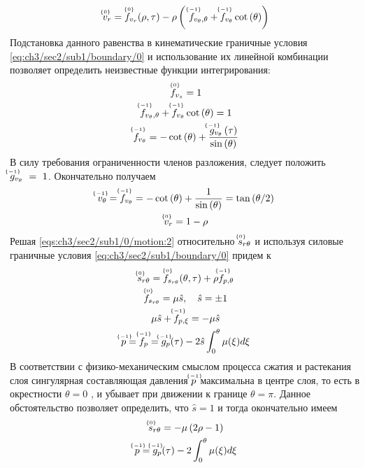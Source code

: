 \begin{equation*}
  \uindex{v}{0}_{r} = \uindex{f}{0}_{v_{r}}(\rho, \tau) -\rho \left(\ \uindex{f}{-1}_{v_{\theta},\theta} + \uindex{f}{-1}_{v_{\theta}} \cot{\left(\theta\right)}\right)
\end{equation*}
Подстановка данного равенства в кинематические граничные условия \cref{eq:ch3/sec2/sub1/boundary/0} и использование их линейной комбинации позволяет определить неизвестные функции интегрирования:
\begin{gather*}
  \uindex{f}{0}_{v_{z}} = 1
  \\
  \uindex{f}{-1}_{v_{\theta},\theta} + \uindex{f}{-1}_{v_{\theta}} \cot{\left(\theta\right)} = 1
  \\
  \uindex{f}{-1}_{v_{\theta}} = -\cot{\left(\theta\right)} + \frac{\uindex{g}{-1}_{v_{\theta}}\left(\tau\right)}{\sin{\left(\theta\right)}}
\end{gather*}
В силу требования ограниченности членов разложения, следует положить $\uindex{g}{-1}_{v_{\theta}}~=~1$. Окончательно получаем
\begin{gather}
  \label{sol:ch3/sec2/sub1/vt/-1}
  \uindex{v}{-1}_{\theta} = \uindex{f}{-1}_{v_{\theta}} = -\cot{\left(\theta\right)} + \frac{1}{\sin{\left(\theta\right)}} = \tan{\left({\theta / 2}\right)}
  \\
  \label{sol:ch3/sec2/sub1/vr/0}
  \uindex{v}{0}_{r} =  1-\rho
\end{gather}
Решая \cref{eqs:ch3/sec2/sub1/0/motion:2} относительно $\uindex{s}{0}_{r\theta}$ и используя силовые граничные условия \cref{eq:ch3/sec2/sub1/boundary/0} придем к
\begin{gather*}
  \uindex{s}{0}_{r\theta} = \uindex{f}{0}_{s_{r\theta}}(\theta, \tau) + \rho  \uindex{f}{-1}_{p,\theta}
  \\
  \uindex{f}{0}_{s_{r\theta}} = \mu\hat{s}, \quad \hat{s} = \pm 1
  \\
  \mu\hat{s} + \uindex{f}{-1}_{p,\xi} = -\mu \hat{s}
  \\
  \uindex{p}{-1}=\uindex{f}{-1}_{p} =\uindex{g}{-1}_{p}(\tau) -2\hat{s}\int_0^{\theta}{\mu(\xi)d\xi}
\end{gather*}
В соответствии с физико-механическим смыслом процесса сжатия и растекания слоя сингулярная составляющая давления $\uindex{p}{-1}$ максимальна в центре слоя, то есть в окрестности $\theta = 0$ , и убывает при движении к границе $\theta=\pi$. Данное обстоятельство позволяет определить, что $\hat{s} = 1$ и тогда окончательно имеем
\begin{gather}
  \label{sol:ch3/sec2/sub1/srt/0}
  \uindex{s}{0}_{r\theta} = -\mu\left(2\rho-1\right)
  \\
  \label{sol:ch3/sec2/sub1/p/-1}
  \uindex{p}{-1} = \uindex{g}{-1}_{p}(\tau) -2\int_0^{\theta}{\mu(\xi)d\xi}
\end{gather}
